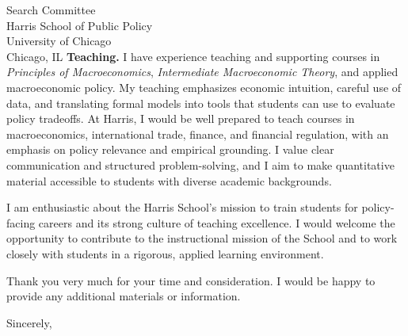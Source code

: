 \documentclass[11pt,letterpaper]{letter}
\begin{document}
\begin{letter}{Search Committee \\
Harris School of Public Policy \\
University of Chicago \\
Chicago, IL}
\textbf{Teaching.} I have experience teaching and supporting courses in \textit{Principles of Macroeconomics}, \textit{Intermediate Macroeconomic Theory}, and applied macroeconomic policy. My teaching emphasizes economic intuition, careful use of data, and translating formal models into tools that students can use to evaluate policy tradeoffs. At Harris, I would be well prepared to teach courses in macroeconomics, international trade, finance, and financial regulation, with an emphasis on policy relevance and empirical grounding. I value clear communication and structured problem-solving, and I aim to make quantitative material accessible to students with diverse academic backgrounds.

I am enthusiastic about the Harris School’s mission to train students for policy-facing careers and its strong culture of teaching excellence. I would welcome the opportunity to contribute to the instructional mission of the School and to work closely with students in a rigorous, applied learning environment.

Thank you very much for your time and consideration. I would be happy to provide any additional materials or information.

\closing{Sincerely,}

\end{letter}
\end{document}
